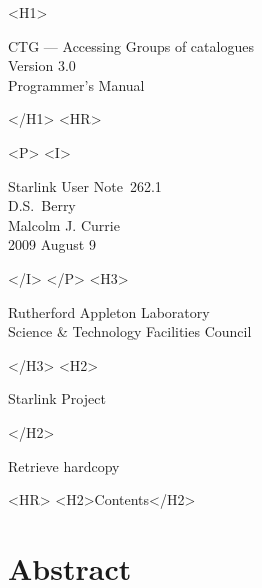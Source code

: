 \documentclass[twoside,11pt]{article}
\newcommand{\stardoccategory}  {Starlink User Note}
\newcommand{\stardocsource}    {sun\stardocnumber}
\newcommand{\stardocnumber}    {262.1}
\newcommand{\stardocauthors}   {D.S.\ Berry \\ Malcolm J. Currie}
\newcommand{\stardocdate}      {2009 August 9}
\newcommand{\stardoctitle}     {CTG --- Accessing Groups of catalogues}
\newcommand{\stardocversion}   {Version 3.0}
\newcommand{\stardocmanual}    {Programmer's Manual}
\newcommand{\htmladdnormallink}[2]{#1}
\newcommand{\htmladdimg}[1]{}
\newcommand{\htmlref}[2]{#1}
\newcommand{\htmladdtonavigation}[1]{}
\newcommand{\xlabel}[1]{}
\renewcommand{\_}{\texttt{\symbol{95}}}
\begin{document}
\begin{htmlonly}
   \xlabel{}
   \begin{rawhtml} <H1> \end{rawhtml}
      \stardoctitle\\
      \stardocversion\\
      \stardocmanual
   \begin{rawhtml} </H1> <HR> \end{rawhtml}


   \begin{rawhtml} <P> <I> \end{rawhtml}
   \stardoccategory\ \stardocnumber \\
   \stardocauthors \\
   \stardocdate
   \begin{rawhtml} </I> </P> <H3> \end{rawhtml}
      \htmladdnormallink{Rutherford Appleton Laboratory}
                        {http://www.scitech.ac.uk} \\
      \htmladdnormallink{Science \& Technology Facilities Council}
                        {http://www.scitech.ac.uk} \\
   \begin{rawhtml} </H3> <H2> \end{rawhtml}
      \htmladdnormallink{Starlink Project}{http://www.starlink.ac.uk/}
   \begin{rawhtml} </H2> \end{rawhtml}
   \htmladdnormallink{\htmladdimg{source.gif} Retrieve hardcopy}
      {http://www.starlink.ac.uk/cgi-bin/hcserver?\stardocsource}\\

  \label{stardoccontents}
  \begin{rawhtml} 
    <HR>
    <H2>Contents</H2>
  \end{rawhtml}
  \htmladdtonavigation{\htmlref{\htmladdimg{contents_motif.gif}}
        {stardoccontents}}

  \section{\xlabel{abstract}Abstract}
\end{htmlonly}
\end{document}

